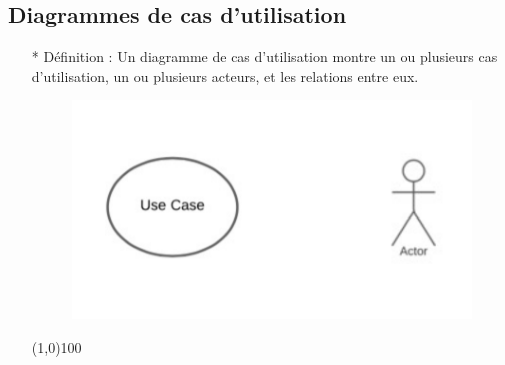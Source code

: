 \documentclass[12pt]{article}
\begin{document}
\subsection{Diagrammes de cas d'utilisation}
\begin{itemize}
	\item [*] Définition : Un diagramme de cas d'utilisation montre un ou plusieurs cas d'utilisation, un ou plusieurs
	acteurs, et les relations entre eux.
	

\begin{figure}[!hbtp]
	\includegraphics[scale=0.75]{Capture.PNG}
\end{figure}

	\line(1,0){100} 	
\end{itemize}
\end{document}
